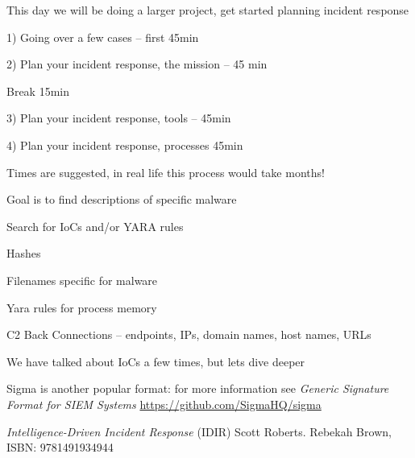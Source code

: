 \documentclass[Screen16to9,17pt]{foils}
\begin{document}
This day we will be doing a larger project, get started planning incident response
\begin{list2}
\item 1) Going over a few cases -- first 45min
\item 2) Plan your incident response, the mission -- 45 min
\item Break 15min
\item 3) Plan your incident response, tools -- 45min
\item 4) Plan your incident response, processes 45min
\end{list2}

Times are suggested, in real life this process would take months!



Goal is to find descriptions of specific malware
\begin{quote}

\end{quote}

Search for IoCs and/or YARA rules
\begin{list2}
\item Hashes
\item Filenames specific for malware
\item Yara rules for process memory
\item C2 Back Connections -- endpoints, IPs, domain names, host names, URLs
\end{list2}




We have talked about IoCs a few times, but lets dive deeper
\begin{quote}

\end{quote}

\begin{list2}
    \item Sigma is another popular format: for more information see \emph{Generic Signature Format for SIEM Systems}
    \url{https://github.com/SigmaHQ/sigma}
\end{list2}







\emph{Intelligence-Driven Incident Response} (IDIR)
 Scott Roberts. Rebekah Brown, ISBN: 9781491934944
\end{document}
